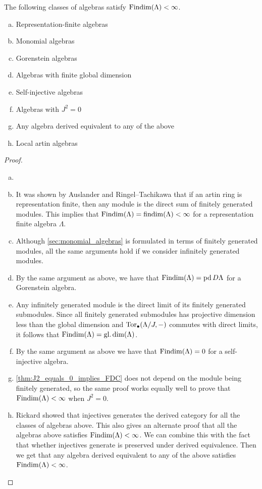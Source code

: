 \begin{theorem}\label{thm:Findim_summary}
	The following classes of algebras satisfy $\operatorname{Findim}(\Lambda) < \infty$.
	\begin{enumerate}[a)]
		\item Representation-finite algebras
		\item Monomial algebras
		\item Gorenstein algebras
		\item Algebras with finite global dimension
		\item Self-injective algebras
		\item Algebras with $J^2=0$
		\item Any algebra derived equivalent to any of the above
		\item Local artin algebras
	\end{enumerate}
	\begin{proof}
		\begin{enumerate}[(a)]
			\item[]
			\item It was shown by Auslander and Ringel--Tachikawa that if an artin ring is representation finite, then any module is the direct sum of finitely generated modules\cite[II Proposition~4.3(c)]{Aus74}\cite[Corollary~4.4]{RT74}. This implies that $\operatorname{Findim}(\Lambda) = \operatorname{findim}(\Lambda) < \infty$ for a representation finite algebra $\Lambda$.
			\item Although \cref{sec:monomial_algebras} is formulated in terms of finitely generated modules, all the same arguments hold if we consider infinitely generated modules. 
			\item \label{item:Findim_gorenstein} By the same argument as above, we have that $\operatorname{Findim}(\Lambda) = \operatorname{pd} D\Lambda$ for a Gorenstein algebra.
			\item Any infinitely generated module is the direct limit of its finitely generated submodules. Since all finitely generated submodules has projective dimension less than the global dimension and $\operatorname{Tor}_\bullet(\Lambda/J, -)$ commutes with direct limits, it follows that $\operatorname{Findim}(\Lambda) = \operatorname{gl.dim}(\Lambda)$.
			\item By the same argument as above we have that $\operatorname{Findim}(\Lambda) = 0$ for a self-injective algebra.
			\item \cref{thm:J2_equals_0_implies_FDC} does not depend on the module being finitely generated, so the same proof works equally well to prove that $\operatorname{Findim}(\Lambda) < \infty$ when $J^2 = 0$.
			\item\label{item:Findim_derived_equiv} Rickard showed that injectives generates the derived category for all the classes of algebras above\cite[Theoreom~3.2, Corrolary~7.4-7.6]{Rick19}. This also gives an alternate proof that all the algebras above satisfies $\operatorname{Findim}(\Lambda) < \infty$. We can combine this with the fact that whether injectives generate is preserved under derived equivalence\cite[Theorem~3.4]{Rick19}. Then we get that any algebra derived equivalent to any of the above satisfies $\operatorname{Findim}(\Lambda) < \infty$.

\end{enumerate}
\end{proof}
\end{theorem}
